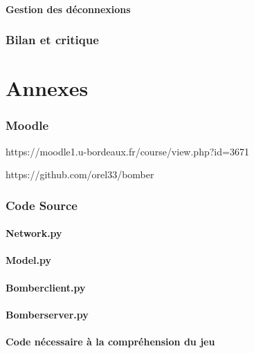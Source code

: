 \documentclass[a4paper]{article}
\begin{document}
		\subsection{Gestion des déconnexions}

	\section{Bilan et critique}

\newpage
\appendix
\part{Annexes}


\section{Moodle} \label{moodle}

https://moodle1.u-bordeaux.fr/course/view.php?id=3671

https://github.com/orel33/bomber

\newpage
\section{Code Source}

\subsection{Network.py} \label{network.py}
\newpage

\subsection{Model.py} \label{model.py}

\newpage

\subsection{Bomber\textunderscore client.py} \label{bomber_client.py}

\newpage

\subsection{Bomber\textunderscore server.py} \label{bomber_server.py}

\newpage

\subsection{Code nécessaire à la compréhension du jeu}

\newpage

\end{document}
